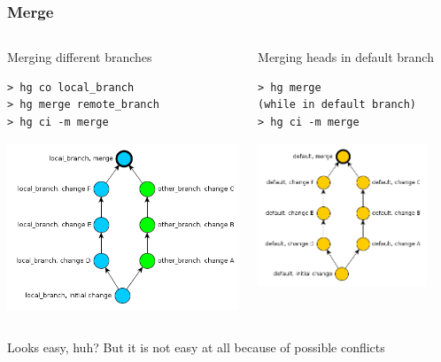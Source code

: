 \documentclass{beamer}
\begin{document}
\begin{frame}[fragile]
\frametitle{Merge}
\begin{columns}[T]
\begin{column}{0.45\textwidth}
\begin{exampleblock}{Merging different branches}
\begin{verbatim}
> hg co local_branch
> hg merge remote_branch
> hg ci -m merge
\end{verbatim}
\end{exampleblock}
\includegraphics[width=\textwidth]{img/two_branches_merged}
\end{column}

\begin{column}{0.45\textwidth}
\begin{exampleblock}{Merging heads in default branch}
\begin{verbatim}
> hg merge 
(while in default branch)
> hg ci -m merge
\end{verbatim}
\end{exampleblock}
\includegraphics[width=0.86\textwidth]{img/two_default_branches_merged}
\end{column}
\end{columns}
\begin{center}
Looks easy, huh? But it is not easy at all because of possible conflicts
\end{center}
\end{frame}
\end{document}
